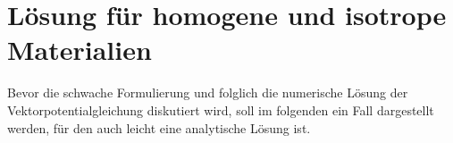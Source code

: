 \section{L\"osung f\"ur homogene und isotrope Materialien}
Bevor die schwache Formulierung und folglich die numerische L\"osung der Vektorpotentialgleichung diskutiert wird, soll im folgenden ein Fall dargestellt werden, f\"ur den auch leicht eine analytische L\"osung ist.
